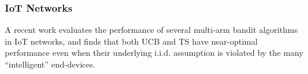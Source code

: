 \documentclass[11pt]{article}
\begin{document}
\subsubsection{IoT Networks}

A recent work \cite{DBLP:journals/corr/abs-1807-00491} evaluates the performance of several multi-arm bandit algorithms in IoT networks, and finds that both UCB and TS have near-optimal performance even when their
underlying i.i.d. assumption is violated by the many “intelligent” end-devices.
\end{document}
